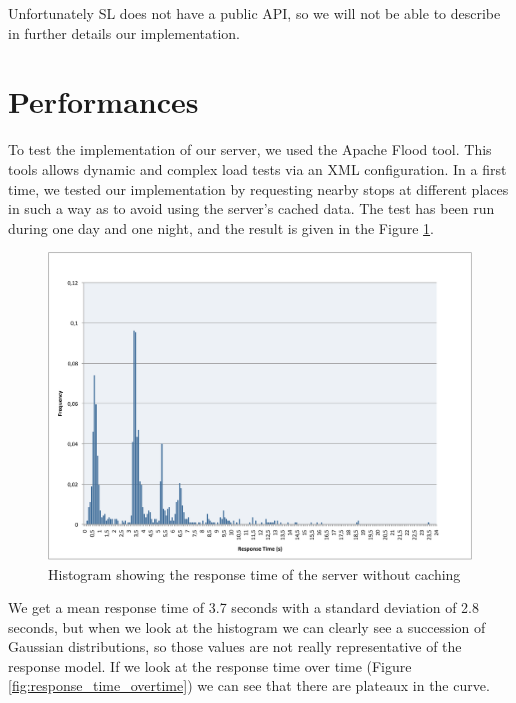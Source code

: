 Unfortunately SL does not have a public API, so we will not be able to describe in further details our implementation.

\clearpage
\section{Performances}

To test the implementation of our server, we used the Apache Flood tool. This tools allows dynamic and complex load tests via an XML configuration. In a first time, we tested our implementation by requesting nearby stops at different places in such a way as to avoid using the server's cached data. The test has been run during one day and one night, and the result is given in the Figure \ref{fig:response_time}.\\

\begin{figure}[ht]
\center
\includegraphics[scale=0.4]{pics/response_time}
\caption{Histogram showing the response time of the server without caching}
\label{fig:response_time}
\end{figure}

We get a mean response time of 3.7 seconds with a standard deviation of 2.8 seconds, but when we look at the histogram we can clearly see a succession of Gaussian distributions, so those values are not really representative of the response model. If we look at the response time over time (Figure \ref{fig:response_time_overtime}) we can see that there are plateaux in the curve.\\

